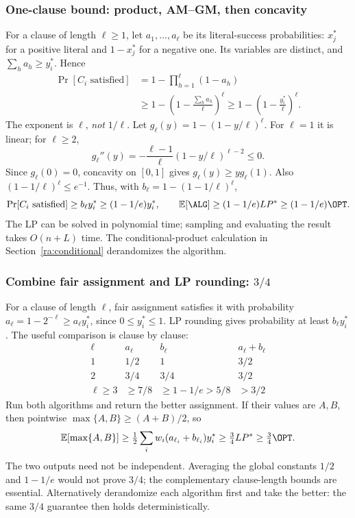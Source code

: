\subsubsection*{One-clause bound: product, AM--GM, then concavity}
For a clause of length $\ell\ge1$, let $a_1,\ldots,a_\ell$ be its
literal-success probabilities: $x_j^*$ for a positive literal and
$1-x_j^*$ for a negative one. Its variables are distinct, and
$\sum_h a_h\ge y_i^*$. Hence
\[
  \begin{aligned}
    \Pr[C_i\text{ satisfied}]
      &=1-\prod_{h=1}^{\ell}(1-a_h)\\
      &\ge1-\left(1-\frac{\sum_h a_h}{\ell}\right)^{\ell}
       \ge1-\left(1-\frac{y_i^*}{\ell}\right)^{\ell}.
  \end{aligned}
\]
The exponent is $\ell$, \emph{not} $1/\ell$.
Let $g_\ell(y)=1-(1-y/\ell)^\ell$. For $\ell=1$ it is linear; for
$\ell\ge2$,
\[
  g_\ell''(y)=-\frac{\ell-1}{\ell}(1-y/\ell)^{\ell-2}\le0.
\]
Since $g_\ell(0)=0$, concavity on $[0,1]$ gives
$g_\ell(y)\ge y g_\ell(1)$. Also
$(1-1/\ell)^\ell\le e^{-1}$. Thus, with
$b_\ell=1-(1-1/\ell)^\ell$,
\[
  \Pr[C_i\text{ satisfied}]
    \ge b_\ell y_i^*\ge(1-1/e)y_i^*,\qquad
  \mathbb E[\ALG]\ge(1-1/e)LP^*\ge(1-1/e)\OPT.
\]
The LP can be solved in polynomial time; sampling and evaluating the result
takes $O(n+L)$ time. The conditional-product calculation in
Section~\ref{ra:conditional} derandomizes the algorithm.

\subsubsection*{Combine fair assignment and LP rounding: $3/4$}
For a clause of length $\ell$, fair assignment satisfies it with probability
$a_\ell=1-2^{-\ell}\ge a_\ell y_i^*$, since $0\le y_i^*\le1$.
LP rounding gives probability at least $b_\ell y_i^*$. The useful comparison
is clause by clause:
\[
  \begin{array}{c|c|c|c}
    \ell&a_\ell&b_\ell&a_\ell+b_\ell\\\hline
    1&1/2&1&3/2\\
    2&3/4&3/4&3/2\\
    \ell\ge3&\ge7/8&\ge1-1/e>5/8&>3/2
  \end{array}
\]
Run both algorithms and return the better assignment. If their values are
$A,B$, then pointwise $\max\{A,B\}\ge(A+B)/2$, so
\[
  \mathbb E[\max\{A,B\}]
    \ge\tfrac12\sum_iw_i(a_{\ell_i}+b_{\ell_i})y_i^*
    \ge\tfrac34LP^*\ge\tfrac34\OPT.
\]
The two outputs need not be independent. Averaging the global constants
$1/2$ and $1-1/e$ would not prove $3/4$; the complementary clause-length
bounds are essential. Alternatively derandomize each algorithm first and
take the better: the same $3/4$ guarantee then holds deterministically.

